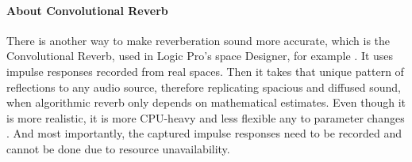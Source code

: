 \paragraph{About Convolutional Reverb}
There is another way to make reverberation sound more accurate, which is the Convolutional Reverb, used in Logic Pro's
space Designer, for example \cite{apple2026spacedesigner}. It uses impulse responses recorded from real spaces. Then it 
takes that unique pattern of reflections to any audio source, therefore replicating spacious and diffused sound, when 
algorithmic reverb only depends on mathematical estimates. Even though it is more realistic, it is more CPU-heavy and 
less flexible any to parameter changes \cite{masteringbox2025convolution}. And most importantly, the captured impulse 
responses need to be recorded and cannot be done due to resource unavailability.


